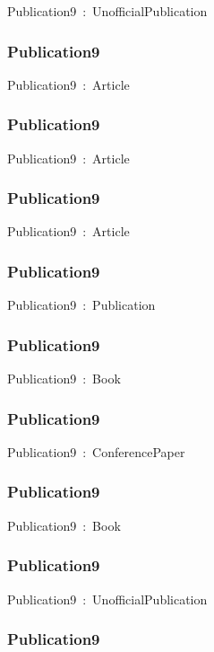 \documentclass{article}
\begin{document}
Publication9~:~UnofficialPublication

\subsubsection*{Publication9}

Publication9~:~Article

\subsubsection*{Publication9}

Publication9~:~Article

\subsubsection*{Publication9}

Publication9~:~Article

\subsubsection*{Publication9}

Publication9~:~Publication

\subsubsection*{Publication9}

Publication9~:~Book

\subsubsection*{Publication9}

Publication9~:~ConferencePaper

\subsubsection*{Publication9}

Publication9~:~Book

\subsubsection*{Publication9}

Publication9~:~UnofficialPublication

\subsubsection*{Publication9}
\end{document}

